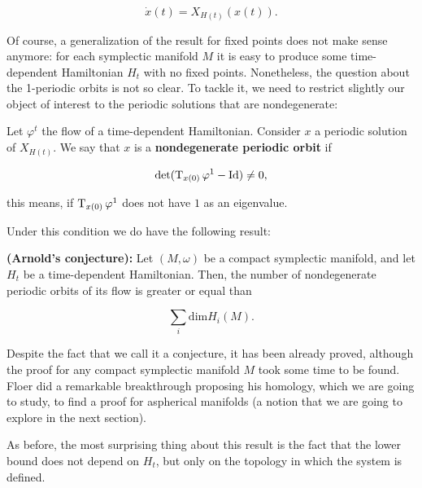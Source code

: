 $$\dot{x}(t) = X_{H(t)}(x(t)) .$$

Of course, a generalization of the result for fixed points does not make sense anymore: for each symplectic manifold $M$ it is easy to produce some time-dependent Hamiltonian $H_t$ with no fixed points. Nonetheless, the question about the 1-periodic orbits is not so clear. To tackle it, we need to restrict slightly our object of interest to the periodic solutions that are nondegenerate:

\begin{deff}
Let $\varphi^t$ the flow of a time-dependent Hamiltonian. Consider $x$ a periodic solution of $X_{H(t)}$. We say that $x$ is a {\bf nondegenerate periodic orbit} if

$$\text{det}(\operatorname T_{x(0)} \varphi^1 - \text{Id}) \neq 0 ,$$

this means, if $\operatorname T_{x(0)} \varphi^1$ does not have $1$ as an eigenvalue.
\end{deff}

Under this condition we do have the following result:

\begin{theo}
{\bf (Arnold's conjecture):} Let $(M,\omega)$ be a compact symplectic manifold, and let $H_t$ be a time-dependent Hamiltonian. Then, the number of nondegenerate periodic orbits of its flow is greater or equal than

$$\sum_i \text{dim}H_i(M) .$$
\end{theo}

Despite the fact that we call it a conjecture, it has been already proved, although the proof for any compact symplectic manifold $M$ took some time to be found. Floer did a remarkable breakthrough proposing his homology, which we are going to study, to find a proof for aspherical manifolds (a notion that we are going to explore in the next section).

As before, the most surprising thing about this result is the fact that the lower bound does not depend on $H_t$, but only on the topology in which the system is defined.
